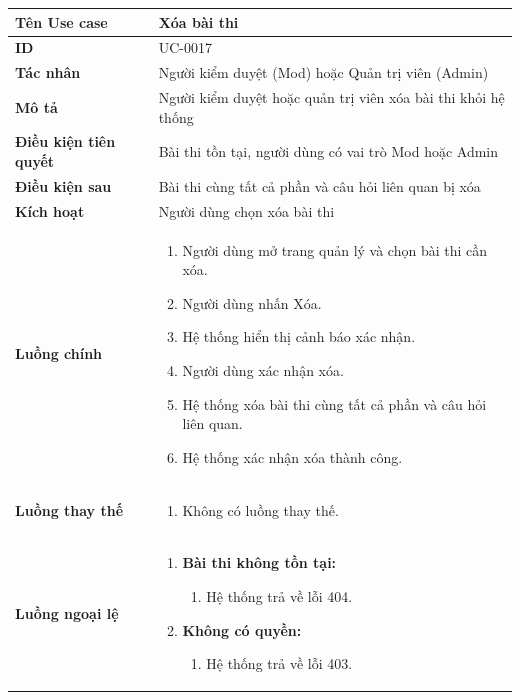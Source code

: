 {
\renewcommand{\arraystretch}{1.5}

\begin{tabularx}{\textwidth}{|>{\raggedright\arraybackslash}X|>{\raggedright\arraybackslash}X|}
\hline
\textbf{Tên Use case} & Xóa bài thi \\
\hline
\textbf{ID} & UC-0017 \\
\hline
\textbf{Tác nhân} & Người kiểm duyệt (Mod) hoặc Quản trị viên (Admin) \\
\hline
\textbf{Mô tả} & Người kiểm duyệt hoặc quản trị viên xóa bài thi khỏi hệ thống \\
\hline
\textbf{Điều kiện tiên quyết} & Bài thi tồn tại, người dùng có vai trò Mod hoặc Admin \\
\hline
\textbf{Điều kiện sau} & Bài thi cùng tất cả phần và câu hỏi liên quan bị xóa \\
\hline
\textbf{Kích hoạt} & Người dùng chọn xóa bài thi \\
\hline
\textbf{Luồng chính} &
\begin{enumerate}
    \item Người dùng mở trang quản lý và chọn bài thi cần xóa.
    \item Người dùng nhấn Xóa.
    \item Hệ thống hiển thị cảnh báo xác nhận.
    \item Người dùng xác nhận xóa.
    \item Hệ thống xóa bài thi cùng tất cả phần và câu hỏi liên quan.
    \item Hệ thống xác nhận xóa thành công.
\end{enumerate} \\
\hline
\textbf{Luồng thay thế} &
\begin{enumerate}
    \item Không có luồng thay thế.
\end{enumerate} \\
\hline
\textbf{Luồng ngoại lệ} &
\begin{enumerate}
    \item \textbf{Bài thi không tồn tại:}
    \begin{enumerate}
        \item[1Err.] Hệ thống trả về lỗi 404.
    \end{enumerate}
    \item \textbf{Không có quyền:}
    \begin{enumerate}
        \item[1Err2.] Hệ thống trả về lỗi 403.
    \end{enumerate}
\end{enumerate} \\
\hline
\end{tabularx}
}
